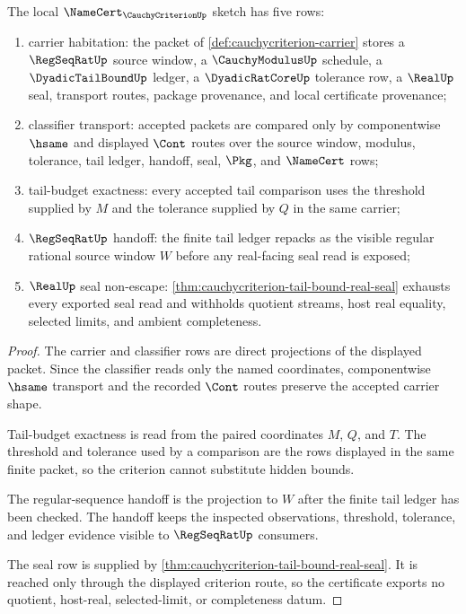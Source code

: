 \begin{theorem}
\label{thm:cauchycriterion-namecert-obligation-sketch}
The local $\NameCert_{\CauchyCriterionUp}$ sketch has five rows:
\begin{enumerate}
\item carrier habitation: the packet of \autoref{def:cauchycriterion-carrier} stores a $\RegSeqRatUp$ source window, a $\CauchyModulusUp$ schedule, a $\DyadicTailBoundUp$ ledger, a $\DyadicRatCoreUp$ tolerance row, a $\RealUp$ seal, transport routes, package provenance, and local certificate provenance;
\item classifier transport: accepted packets are compared only by componentwise $\hsame$ and displayed $\Cont$ routes over the source window, modulus, tolerance, tail ledger, handoff, seal, $\Pkg$, and $\NameCert$ rows;
\item tail-budget exactness: every accepted tail comparison uses the threshold supplied by $M$ and the tolerance supplied by $Q$ in the same carrier;
\item $\RegSeqRatUp$ handoff: the finite tail ledger repacks as the visible regular rational source window $W$ before any real-facing seal read is exposed;
\item $\RealUp$ seal non-escape: \autoref{thm:cauchycriterion-tail-bound-real-seal} exhausts every exported seal read and withholds quotient streams, host real equality, selected limits, and ambient completeness.
\end{enumerate}
\end{theorem}
\begin{proof}
The carrier and classifier rows are direct projections of the displayed packet. Since the classifier reads only the named coordinates, componentwise $\hsame$ transport and the recorded $\Cont$ routes preserve the accepted carrier shape.

Tail-budget exactness is read from the paired coordinates $M$, $Q$, and $T$. The threshold and tolerance used by a comparison are the rows displayed in the same finite packet, so the criterion cannot substitute hidden bounds.

The regular-sequence handoff is the projection to $W$ after the finite tail ledger has been checked. The handoff keeps the inspected observations, threshold, tolerance, and ledger evidence visible to $\RegSeqRatUp$ consumers.

The seal row is supplied by \autoref{thm:cauchycriterion-tail-bound-real-seal}. It is reached only through the displayed criterion route, so the certificate exports no quotient, host-real, selected-limit, or completeness datum.
\end{proof}

